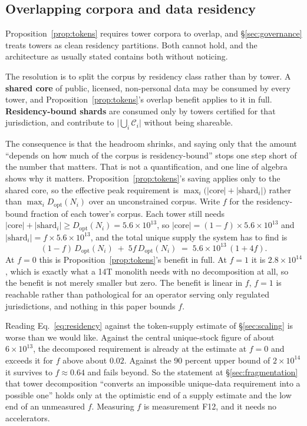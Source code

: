 \documentclass[11pt]{article}
\begin{document}
\subsection{Overlapping corpora and data residency}
\label{sec:residency}

Proposition~\ref{prop:tokens} requires tower corpora to overlap, and \S\ref{sec:governance} treats towers as clean residency partitions. Both cannot hold, and the architecture as usually stated contains both without noticing.

The resolution is to split the corpus by residency class rather than by tower. A \textbf{shared core} of public, licensed, non-personal data may be consumed by every tower, and Proposition~\ref{prop:tokens}'s overlap benefit applies to it in full. \textbf{Residency-bound shards} are consumed only by towers certified for that jurisdiction, and contribute to $\bigl|\bigcup_i \mathcal{C}_i\bigr|$ without being shareable.

The consequence is that the headroom shrinks, and saying only that the amount ``depends on how much of the corpus is residency-bound'' stops one step short of the number that matters. That is not a quantification, and one line of algebra shows why it matters. Proposition~\ref{prop:tokens}'s saving applies only to the shared core, so the effective peak requirement is $\max_i \bigl(|\text{core}| + |\text{shard}_i|\bigr)$ rather than $\max_i D_{\mathrm{opt}}(N_i)$ over an unconstrained corpus. Write $f$ for the residency-bound fraction of each tower's corpus. Each tower still needs $|\text{core}| + |\text{shard}_i| \geq D_{\mathrm{opt}}(N_i) = 5.6\times10^{13}$, so $|\text{core}| = (1-f)\times5.6\times10^{13}$ and $|\text{shard}_i| = f\times5.6\times10^{13}$, and the total unique supply the system has to find is
\begin{equation}
(1-f)\,D_{\mathrm{opt}}(N_i) \;+\; 5 f\, D_{\mathrm{opt}}(N_i) \;=\; 5.6\times10^{13}\,(1 + 4f).
\label{eq:residency}
\end{equation}
At $f=0$ this is Proposition~\ref{prop:tokens}'s benefit in full. At $f=1$ it is $2.8\times10^{14}$, which is exactly what a 14T monolith needs with no decomposition at all, so the benefit is not merely smaller but zero. The benefit is linear in $f$, $f=1$ is reachable rather than pathological for an operator serving only regulated jurisdictions, and nothing in this paper bounds $f$.

Reading Eq.~\eqref{eq:residency} against the token-supply estimate of \S\ref{sec:scaling} is worse than we would like. Against the central unique-stock figure of about $6\times10^{13}$, the decomposed requirement is already at the estimate at $f=0$ and exceeds it for $f$ above about $0.02$. Against the 90 percent upper bound of $2\times10^{14}$ it survives to $f \approx 0.64$ and fails beyond. So the statement at \S\ref{sec:fragmentation} that tower decomposition ``converts an impossible unique-data requirement into a possible one'' holds only at the optimistic end of a supply estimate and the low end of an unmeasured $f$. Measuring $f$ is measurement F12, and it needs no accelerators.
\end{document}
